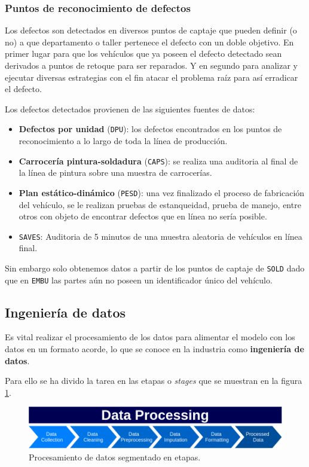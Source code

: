 \documentclass[a4paper,12pt]{article}
\begin{document}
		\subsubsection{Puntos de reconocimiento de defectos} \label{ptocptj}
		Los defectos son detectados en diversos puntos de captaje que pueden definir (o no) a que departamento o taller pertenece el defecto con un doble objetivo. En primer lugar para que los vehículos que ya poseen el defecto detectado sean derivados a puntos de retoque para ser reparados. Y en segundo para analizar y ejecutar diversas estrategias con el fin atacar el problema raíz para así erradicar el defecto.
				
		Los defectos detectados provienen de las siguientes fuentes de datos:
		\begin{itemize}[noitemsep, topsep=2pt]
			\item \textbf{Defectos por unidad} (\texttt{DPU}): los defectos encontrados en los puntos de reconocimiento a lo largo de toda la línea de producción.
			\item \textbf{Carrocería pintura-soldadura} (\texttt{CAPS}): se realiza una auditoria al final de la línea de pintura sobre una muestra de carrocerías.
			\item \textbf{Plan estático-dinámico} (\texttt{PESD}): una vez finalizado el proceso de fabricación del vehículo, se le realizan pruebas de estanqueidad, prueba de manejo, entre otros con objeto de encontrar defectos que en línea no sería posible.
			\item \texttt{SAVES}: Auditoria de 5 minutos de una muestra aleatoria de vehículos en línea final.
		\end{itemize}
				
		Sin embargo solo obtenemos datos a partir de los puntos de captaje de \texttt{SOLD} dado que en \texttt{EMBU} las partes aún no poseen un identificador único del vehículo.
				
		\subsection{Ingeniería de datos}
		Es vital realizar el procesamiento de los datos para alimentar el modelo con los datos en un formato acorde, lo que se conoce en la industria como \textbf{ingeniería de datos}.
				
		Para ello se ha divido la tarea en las etapas o \textit{stages} que se muestran en la figura \ref{fig:dataproc}.
				
		\begin{figure}[H]
			\begin{center}				
				\includegraphics[width=1\textwidth]{dataproc.png}
				\caption{Procesamiento de datos segmentado en etapas.}
				\label{fig:dataproc}
			\end{center}
		\end{figure}
				
\end{document}
